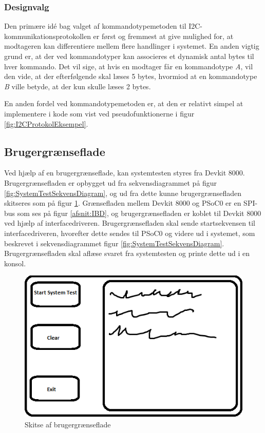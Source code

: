 \subsubsection{Designvalg}
Den primære idé bag valget af kommandotypemetoden til I2C-kommunikationsprotokollen er først og fremmest at give  mulighed for, at modtageren kan differentiere mellem flere handlinger i systemet. En anden vigtig grund er, at der ved kommandotyper kan associeres et dynamisk antal bytes til hver kommando. Det vil sige, at hvis en modtager får en kommandotype \textit{A}, vil den vide, at der efterfølgende skal læses 5 bytes, hvormiod at en kommandotype \textit{B} ville betyde, at der kun skulle læses 2 bytes.\newline

\noindent En anden fordel ved kommandotypemetoden er, at den er relativt simpel at implementere i kode som vist ved pseudofunktionerne i figur \ref{fig:I2CProtokolEksempel}.

\subsection{Brugergrænseflade}
Ved hjælp af en brugergrænseflade, kan systemtesten styres fra Devkit 8000.
Brugergrænsefladen er opbygget ud fra sekvensdiagrammet på figur \ref{fig:SystemTestSekvensDiagram}, og ud fra dette kunne brugergrænsefladen skitseres som på figur \ref{fig:GUISkitse}.
Grænsefladen mellem Devkit 8000 og PSoC0 er en SPI-bus som ses på figur \ref{afsnit:IBD}, og brugergrænsefladen er koblet til Devkit 8000 ved hjælp af interfacedriveren.
Brugergrænsefladen skal sende startsekvensen til interfacedriveren, hvorefter dette sendes til PSoC0 og videre ud i systemet, som beskrevet i sekvensdiagrammet figur \ref{fig:SystemTestSekvensDiagram}.
Brugergrænsefladen skal aflæse svaret fra systemtesten og printe dette ud i en konsol.

\begin{figure}[H]
	\centering
	\includegraphics[width=\textwidth] {Systemarkitektur/images/GUISkitse}
	\caption{Skitse af brugergrænseflade}
	\label{fig:GUISkitse}
\end{figure}


